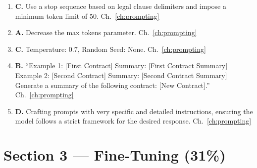 \begin{enumerate}[resume,leftmargin=*]
  \item \textbf{C.} Use a stop sequence based on legal clause delimiters and impose a minimum token limit of 50. \hfill Ch.~\ref{ch:prompting}
  \item \textbf{A.} Decrease the max tokens parameter. \hfill Ch.~\ref{ch:prompting}
  \item \textbf{C.} Temperature: 0.7, Random Seed: None. \hfill Ch.~\ref{ch:prompting}
  \item \textbf{B.} ``Example 1: [First Contract] Summary: [First Contract Summary] Example 2: [Second Contract] Summary: [Second Contract Summary] Generate a summary of the following contract: [New Contract].'' \hfill Ch.~\ref{ch:prompting}
  \item \textbf{D.} Crafting prompts with very specific and detailed instructions, ensuring the model follows a strict framework for the desired response. \hfill Ch.~\ref{ch:prompting}
\end{enumerate}

\section*{Section 3 --- Fine-Tuning (31\%)}

